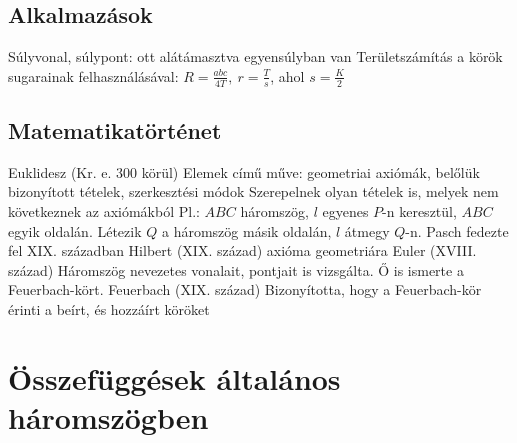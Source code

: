 \documentclass[twoside,12pt]{report}
\theoremstyle{definition}
\begin{document}
\section{Alkalmazások}
	\begin{outline}
		\1 Súlyvonal, súlypont: ott alátámasztva egyensúlyban van
		\1 Területszámítás a körök sugarainak felhasználásával: $R=\frac{abc}{4T},\ r=\frac{T}{s}$, ahol $s=\frac{K}{2}$
	\end{outline}
\section{Matematikatörténet}
	\begin{outline}
		\1 Euklidesz (Kr. e. 300 körül)
			\2 Elemek című műve: geometriai axiómák, belőlük bizonyított tételek, szerkesztési módok
			\2 Szerepelnek olyan tételek is, melyek nem következnek az axiómákból
			\2 Pl.:  $ABC$ háromszög, $l$ egyenes $P$-n keresztül, $ABC$ egyik oldalán. Létezik $Q$ a háromszög másik oldalán, $l$ átmegy $Q$-n.
				\3 Pasch fedezte fel XIX. században
		\1 Hilbert (XIX. század)
			 axióma geometriára
		\1 Euler (XVIII. század) 
			\2 Háromszög nevezetes vonalait, pontjait is vizsgálta. Ő is ismerte a Feuerbach-kört.
		\1 Feuerbach (XIX. század)
			\2 Bizonyította, hogy a Feuerbach-kör érinti a beírt, és hozzáírt köröket
	\end{outline}
\chapter{Összefüggések általános háromszögben}
\end{document}

